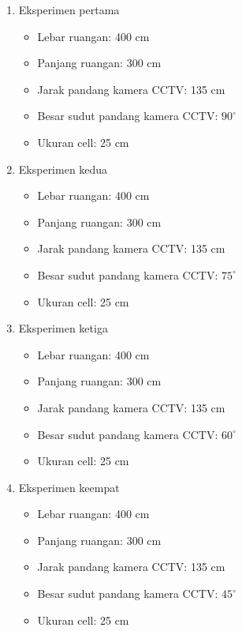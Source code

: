 \begin{enumerate}
	\item Eksperimen pertama
	\begin{itemize}
		\item Lebar ruangan: 400 cm
		\item Panjang ruangan: 300 cm
		\item Jarak pandang kamera CCTV: 135 cm
		\item Besar sudut pandang kamera CCTV: \(90^\circ\)
		\item Ukuran cell: 25 cm
	\end{itemize}
	
	\item Eksperimen kedua
	\begin{itemize}
		\item Lebar ruangan: 400 cm
		\item Panjang ruangan: 300 cm
		\item Jarak pandang kamera CCTV: 135 cm
		\item Besar sudut pandang kamera CCTV: \(75^\circ\)
		\item Ukuran cell: 25 cm
	\end{itemize}
	
	\item Eksperimen ketiga
	\begin{itemize}
		\item Lebar ruangan: 400 cm
		\item Panjang ruangan: 300 cm
		\item Jarak pandang kamera CCTV: 135 cm
		\item Besar sudut pandang kamera CCTV: \(60^\circ\)
		\item Ukuran cell: 25 cm
	\end{itemize}
	
	\item Eksperimen keempat
	\begin{itemize}
		\item Lebar ruangan: 400 cm
		\item Panjang ruangan: 300 cm
		\item Jarak pandang kamera CCTV: 135 cm
		\item Besar sudut pandang kamera CCTV: \(45^\circ\)
		\item Ukuran cell: 25 cm
	\end{itemize}
\end{enumerate}


